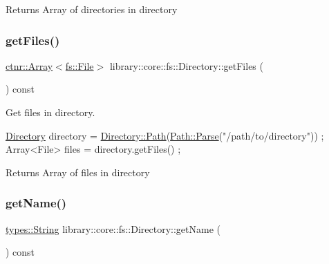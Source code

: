 \begin{DoxyReturn}{Returns}
Array of directories in directory 
\end{DoxyReturn}
\mbox{\label{classlibrary_1_1core_1_1fs_1_1Directory_a9c80c3a09389bb6f024e9a9001dea432}} 
\subsubsection{\texorpdfstring{get\+Files()}{getFiles()}}
{\footnotesize\ttfamily \hyperlink{classlibrary_1_1core_1_1ctnr_1_1Array}{ctnr\+::\+Array}$<$\hyperlink{classlibrary_1_1core_1_1fs_1_1File}{fs\+::\+File}$>$ library\+::core\+::fs\+::\+Directory\+::get\+Files (\begin{DoxyParamCaption}{ }\end{DoxyParamCaption}) const}



Get files in directory. 


\begin{DoxyCode}
\hyperlink{classlibrary_1_1core_1_1fs_1_1Directory_a3ec39f6cad19a81d520e9a1f2d8bb1f7}{Directory} directory = \hyperlink{classlibrary_1_1core_1_1fs_1_1Directory_a6d3ea04654841e62a4dbd99feb563caf}{Directory::Path}(\hyperlink{classlibrary_1_1core_1_1fs_1_1Path_aebf5bd3af83e0b7376616e146f3e55df}{Path::Parse}(\textcolor{stringliteral}{"/path/to/directory"}))
       ;
Array<File> files = directory.getFiles() ;
\end{DoxyCode}


\begin{DoxyReturn}{Returns}
Array of files in directory 
\end{DoxyReturn}
\mbox{\label{classlibrary_1_1core_1_1fs_1_1Directory_acc2dd0ae02ee3733bf20f93ac1d05a56}} 
\subsubsection{\texorpdfstring{get\+Name()}{getName()}}
{\footnotesize\ttfamily \hyperlink{classlibrary_1_1core_1_1types_1_1String}{types\+::\+String} library\+::core\+::fs\+::\+Directory\+::get\+Name (\begin{DoxyParamCaption}{ }\end{DoxyParamCaption}) const}



